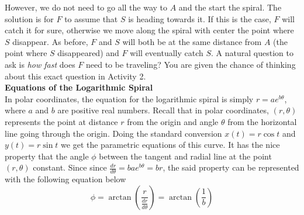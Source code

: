 However, we do not need to go all the way to $A$ and the start the spiral. The solution is for $F$ to assume that $S$ is heading towards it. If this is the case, $F$ will catch it for sure, otherwise we move along the spiral with center the point where $S$ disappear. As before, $F$ and $S$ will both be at the same distance from $A$ (the point where $S$ disappeared) and $F$ will eventually catch $S$. A natural question to ask is \emph{how fast} does $F$ need to be traveling? You are given the chance of thinking about this exact question in Activity 2. \\

\noindent\textbf{\large Equations of the Logarithmic Spiral} \\

In polar coordinates, the equation for the logarithmic spiral is simply  $r=ae^{b\theta}$, where $a$ and $b$ are positive real numbers. Recall that in polar coordinates, $(r,\theta)$ represents the point at distance $r$ from the origin and angle $\theta$ from the horizontal line going through the origin. Doing the standard conversion $x(t) = r \cos t$ and $y(t) = r \sin t$ we get the parametric equations of this curve. It has the nice property that the angle $\phi$ between the tangent and radial line at the point $(r,\theta)$ constant. Since since $\frac{dr}{d\theta}=bae^{b\theta}=br$, the said property can be represented with the following equation below
	\[
	\phi=\arctan\left(\dfrac{r}{\frac{dr}{d\theta}}\right) = \arctan\left(\dfrac{1}{b}\right)
	\]

 \vspace{0.2cm}


